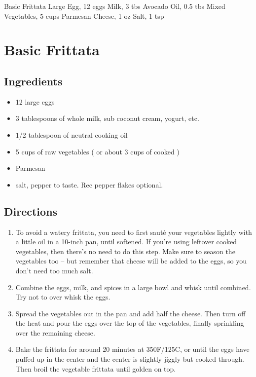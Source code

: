 Basic Frittata
  Large Egg, 12 eggs
  Milk, 3 tbs
  Avocado Oil, 0.5 tbs
  Mixed Vegetables, 5 cups
  Parmesan Cheese, 1 oz
  Salt, 1 tsp

\section{ Basic Frittata }

\subsection{ Ingredients }

\begin{itemize}
  \item 12 large eggs
  \item 3 tablespoons of whole milk, sub coconut cream, yogurt, etc.
  \item 1/2 tablespoon of neutral cooking oil
  \item 5 cups of raw vegetables ( or about 3 cups of cooked )
  \item Parmesan
  \item salt, pepper to taste. Rec pepper flakes optional.
\end{itemize}

\subsection{ Directions }

\begin{enumerate}
  \item To avoid a watery frittata, you need to first sauté your vegetables lightly with a little oil in a 10-inch pan, until softened. If you’re using leftover cooked vegetables, then there’s no need to do this step. Make sure to season the vegetables too – but remember that cheese will be added to the eggs, so you don’t need too much salt.
  \item Combine the eggs, milk, and spices in a large bowl and whisk until combined. Try not to over whisk the eggs.
  \item Spread the vegetables out in the pan and add half the cheese. Then turn off the heat and pour the eggs over the top of the vegetables, finally sprinkling over the remaining cheese.
  \item Bake the frittata for around 20 minutes at 350F/125C, or until the eggs have puffed up in the center and the center is slightly jiggly but cooked through. Then broil the vegetable frittata until golden on top.
\end{enumerate}

